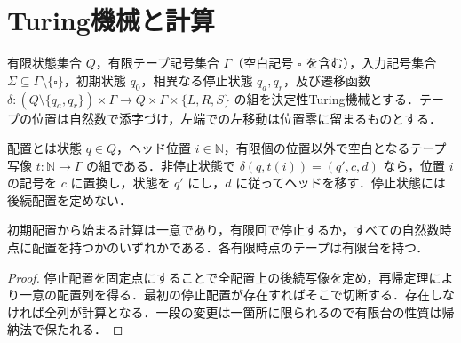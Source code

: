 \section{Turing機械と計算}
\begin{defn}[決定性Turing機械]
有限状態集合 $Q$，有限テープ記号集合 $\Gamma$（空白記号 $\square$ を含む），入力記号集合 $\Sigma\subseteq\Gamma\setminus\{\square\}$，初期状態 $q_0$，相異なる停止状態 $q_a,q_r$，及び遷移函数 $\delta:(Q\setminus\{q_a,q_r\})\times\Gamma\to Q\times\Gamma\times\{L,R,S\}$ の組を決定性Turing機械とする．テープの位置は自然数で添字づけ，左端での左移動は位置零に留まるものとする．
\end{defn}
\begin{defn}[配置と一段の計算]
配置とは状態 $q\in Q$，ヘッド位置 $i\in\mathbb N$，有限個の位置以外で空白となるテープ写像 $t:\mathbb N\to\Gamma$ の組である．非停止状態で $\delta(q,t(i))=(q',c,d)$ なら，位置 $i$ の記号を $c$ に置換し，状態を $q'$ にし，$d$ に従ってヘッドを移す．停止状態には後続配置を定めない．
\end{defn}
\begin{prop}[計算の一意性]
初期配置から始まる計算は一意であり，有限回で停止するか，すべての自然数時点に配置を持つかのいずれかである．各有限時点のテープは有限台を持つ．
\end{prop}
\begin{proof}
停止配置を固定点にすることで全配置上の後続写像を定め，再帰定理により一意の配置列を得る．最初の停止配置が存在すればそこで切断する．存在しなければ全列が計算となる．一段の変更は一箇所に限られるので有限台の性質は帰納法で保たれる．
\end{proof}
